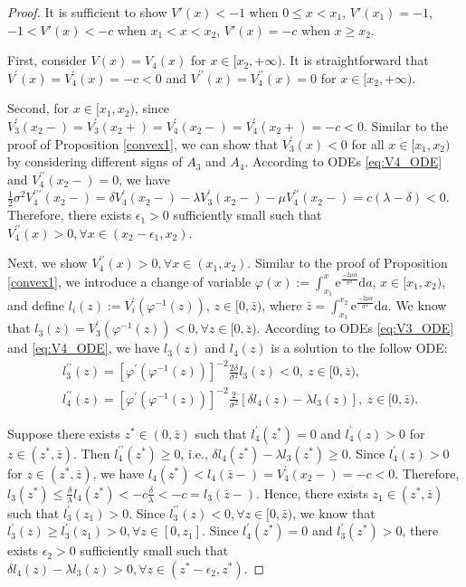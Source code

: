 \documentclass[11pt,reqno]{article}%
\numberwithin{equation}{section}
\begin{document}
\begin{proof}
It is sufficient to show $V'(x) < -1$ when $0\le x < x_1$, $V'(x_1)=-1$, $-1 < V'(x) < -c$ when $x_1 < x < x_2$, $V'(x) =-c$ when $x\ge x_2$.

First, consider $V(x)=V_4(x)$ for $x \in [x_2, +\infty)$. It is straightforward that $V^\prime(x)=V_4^\prime(x) = -c < 0$ and $V^{\prime\prime}(x)=V_4^{\prime\prime}(x) =0$ for $x \in [x_2, +\infty)$. 

Second, for $x \in [x_1, x_2)$, since $V^\prime_3(x_2-) = V^\prime_3(x_2+)=V^\prime_4(x_2-) = V^\prime_4(x_2+)=-c < 0$. Similar to the proof of Proposition \ref{convex1}, we can show that $V^\prime_3(x) < 0$ for all $x \in [x_1, x_2)$ by considering different signs of $A_{3}$ and $A_{4}$. According to ODEs \eqref{eq:V4_ODE} and $V_4^{\prime\prime}(x_2-) =0$, we have $\frac{1}{2}\sigma^2V_4^{\prime\prime\prime}(x_2-)=\delta V^\prime_4(x_2-)-\lambda V^\prime_3(x_2-)-\mu V^{\prime\prime}_4(x_2-)=c(\lambda-\delta)<0$. Therefore, there exists $\epsilon_1>0$ sufficiently small such that $V^{\prime\prime}_4(x)>0, \forall x\in(x_2-\epsilon_1,x_2)$.

Next, we show $V_4^{\prime\prime}(x)>0, \forall x\in(x_1,x_2)$. Similar to the proof of Proposition \ref{convex1}, we introduce a change of variable $\varphi(x) := \int_{x_1}^x \mathrm{e}^{\frac{-2 \mu a}{\sigma^2}} \mathrm{d}a$, $x \in [x_1, x_2)$,
and define $l_i(z) := V_i^\prime(\varphi^{-1}(z))$, $z\in[0,\bar z)$, where $\bar z = \int_{x_1}^{x_2} \mathrm{e}^{\frac{-2 \mu a}{\sigma^2}} \mathrm{d}a$. We know that $l_3(z)=V_3^{\prime}(\varphi^{-1}(z))<0, \forall z\in[0,\bar z)$. According to ODEs \eqref{eq:V3_ODE} and \eqref{eq:V4_ODE}, we have $l_3(z)$ and $l_4(z)$ is a solution to the follow ODE:
\begin{equation}\nonumber\begin{aligned}
 &l_3^{\prime\prime}(z) =\left[\varphi^\prime(\varphi^{-1}(z))\right]^{-2} \frac{2 \delta}{\sigma^2} l_3(z)<0,\ z\in[0,\bar z),\\
 &l_4^{\prime\prime}(z) =\left[\varphi^\prime(\varphi^{-1}(z))\right]^{-2} \frac{2 }{\sigma^2} \left[\delta l_4(z)-\lambda l_3(z)\right],\ z\in[0,\bar z).
\end{aligned}\end{equation}

Suppose there exists $z^* \in (0, \bar z)$ such that $l_4^\prime(z^*) = 0$ and $l_4^\prime(z) > 0$ for $z \in (z^*, \bar z)$.  Then $l_4^{\prime\prime}(z^*) \ge 0$, i.e., $\delta l_4(z^*)-\lambda l_3(z^*)\ge 0$. Since $l_4^\prime(z) > 0$ for $z \in (z^*, \bar z)$, we have $l_4(z^*)<l_4(\bar z-)=V_4^\prime(x_2-)=-c<0$. Therefore, $l_3(z^*)\le \frac{\delta}{\lambda}l_4(z^*)<-c\frac{\delta}{\lambda}<-c=l_3(\bar z-)$. Hence, there exists $z_1\in(z^*,\bar z)$ such that $l_3^{\prime}(z_1)>0$. Since $l_3^{\prime\prime}(z)<0, \forall z\in[0,\bar z)$, we know that $l_3^{\prime}(z)\ge l_3^{\prime}(z_1)>0, \forall z\in [0,z_1]$. Since $l_4^{\prime}(z^*)=0$ and $l_3^{\prime}(z^*)>0$, there exists $\epsilon_2>0$ sufficiently small such that $\delta l_4(z)-\lambda l_3(z)>0, \forall z\in(z^*-\epsilon_2,z^*)$.


\end{proof}
\end{document}
